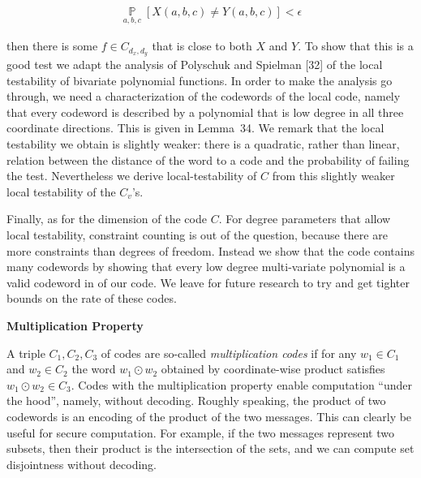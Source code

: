 \[\begin{gathered}
\operatorname*{\mathbb{P}}_{a,b,c}[X(a,b,c)\neq Y(a,b,c)]<\epsilon
\end{gathered}\]


then there is some $f\in C_{d_{x},d_{y}}$ that is close to both $X$ and $Y$.
To show that this is a good test we adapt the analysis of Polyschuk and Spielman [32] of the local testability of bivariate polynomial functions. In order to make the analysis go through, we need a characterization of the codewords of the local code, namely that every codeword is described by a polynomial that is low degree in all three coordinate directions. This is given in Lemma 34.
We remark that the local testability we obtain is slightly weaker: there is a quadratic, rather than linear, relation between the distance of the word to a code and the probability of failing the test. Nevertheless we derive local-testability of $C$ from this slightly weaker local testability of the $C_{v}$’s.\par




Finally, as for the dimension of the code $C$. For degree parameters that allow local testability, constraint counting is out of the question, because there are more constraints than degrees of freedom. Instead we show that the code contains many codewords by showing that every low degree multi-variate polynomial is a valid codeword in of our code. We leave for future research to try and get tighter bounds on the rate of these codes.\par




\par\medskip\noindent\textbf{Multiplication Property}\par




A triple $C_{1},C_{2},C_{3}$ of codes are so-called \emph{multiplication codes} if for any $w_{1}\in C_{1}$ and $w_{2}\in C_{2}$ the word $w_{1}\odot w_{2}$ obtained by coordinate-wise product satisfies $w_{1}\odot w_{2}\in C_{3}$. Codes with the multiplication property enable computation “under the hood”, namely, without decoding. Roughly speaking, the product of two codewords is an encoding of the product of the two messages. This can clearly be useful for secure computation. For example, if the two messages represent two subsets, then their product is the intersection of the sets, and we can compute set disjointness without decoding.\par




